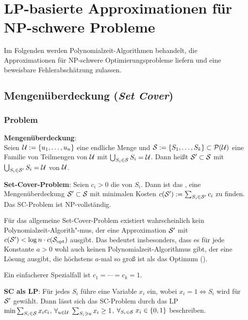 \chapter{%
    LP-basierte Approximationen für NP-schwere Probleme%
}

Im Folgenden werden Polynomialzeit-Algorithmen behandelt, die Approximationen für NP-schwere
Optimierungsprobleme liefern und eine beweisbare Fehlerabschätzung zulassen.

\section{%
    Mengenüberdeckung (\emph{Set Cover})%
}

\subsection{%
    Problem%
}

\textbf{Mengenüberdeckung}:\\
Seien $\U := \{u_1, \dotsc, u_n\}$ eine endliche Menge und
$\S := \{S_1, \dotsc, S_k\} \subset \P(\U)$ eine Familie von Teilmengen von $\U$
mit $\bigcup_{S_i \in \S} S_i = \U$.
Dann heißt $\S' \subset \S$ mit $\bigcup_{S_i \in \S'} S_i = \U$
 von $\U$.

\textbf{Set-Cover-Problem}:
Seien $c_i > 0$ die  von $S_i$.
Dann ist das ,
eine Mengenüberdeckung $\S' \subset \S$ mit minimalen Kosten
$c(\S') := \sum_{S_i \in \S'} c_i$ zu finden.\\
Das SC-Problem ist NP-vollständig.

Für das allgemeine Set-Cover-Problem existiert wahrscheinlich kein Polynomialzeit-Algorith"-mus,
der eine Approximation $\S'$ mit $c(\S') < \log n \cdot c(\S_\opt)$ ausgibt.
Das bedeutet insbesonders, dass es für jede Konstante $a > 0$ wohl auch keinen
Polynomialzeit-Algorithmus gibt, der
eine Lösung ausgibt, die höchstens $a$-mal so groß ist als das Optimum
().

Ein einfacherer Spezialfall ist $c_1 = \dotsb = c_k = 1$.

\linie

\textbf{SC als LP}:
Für jedes $S_i$ führe eine Variable $x_i$ ein, wobei $x_i = 1 \iff S_i$ wird für $\S'$ gewählt.
Dann lässt sich das SC-Problem durch das LP\\
$\min \sum_{S_i \in \S} x_i c_i$, $\forall_{u \in \U}\; \sum_{S_i \ni u} x_i \ge 1$,
$\forall_{S_i \in \S}\; x_i \in \{0, 1\}$ beschreiben.

